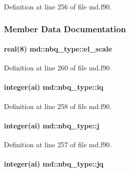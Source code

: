 Definition at line 256 of file md.\-f90.



\subsubsection{Member Data Documentation}
\hypertarget{structmd_1_1nbq__type_a761917eaa9155f98db23f85deb58dc05}{
\paragraph[{el\-\_\-scale}]{\setlength{\rightskip}{0pt plus 5cm}real(8) md\-::nbq\-\_\-type\-::el\-\_\-scale}}\label{structmd_1_1nbq__type_a761917eaa9155f98db23f85deb58dc05}


Definition at line 260 of file md.\-f90.

\hypertarget{structmd_1_1nbq__type_a36c6111b2a1dce5444e430199d01b7ba}{
\paragraph[{iq}]{\setlength{\rightskip}{0pt plus 5cm}integer(ai) md\-::nbq\-\_\-type\-::iq}}\label{structmd_1_1nbq__type_a36c6111b2a1dce5444e430199d01b7ba}


Definition at line 258 of file md.\-f90.

\hypertarget{structmd_1_1nbq__type_ae7410f8308449340827367663a3c4b98}{
\paragraph[{j}]{\setlength{\rightskip}{0pt plus 5cm}integer(ai) md\-::nbq\-\_\-type\-::j}}\label{structmd_1_1nbq__type_ae7410f8308449340827367663a3c4b98}


Definition at line 257 of file md.\-f90.

\hypertarget{structmd_1_1nbq__type_a58457a2a9425c0d2af0987b689c374c5}{
\paragraph[{jq}]{\setlength{\rightskip}{0pt plus 5cm}integer(ai) md\-::nbq\-\_\-type\-::jq}}\label{structmd_1_1nbq__type_a58457a2a9425c0d2af0987b689c374c5}


